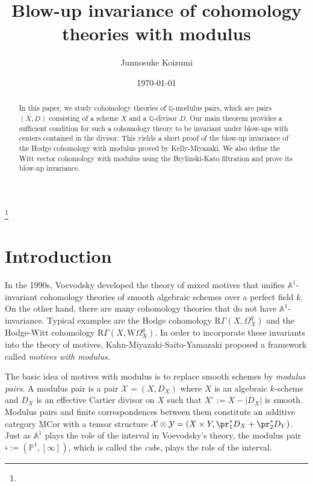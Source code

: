 \documentclass{amsart}
\theoremstyle{plain}
\theoremstyle{definition}
\theoremstyle{remark}
\numberwithin{equation}{section}
\def\bcube{{\overline{\square}}}
\def\RGamma{\mathrm{R}\Gamma}
\def\WOmega{\mathrm{W}\Omega}
\def\MCor{\mathrm{\underline{M}Cor}}
\begin{document}
\title{Blow-up invariance of cohomology theories with modulus}

\author[J. Koizumi]{Junnosuke Koizumi}
\address{Graduate School of Mathematical Sciences, University of Tokyo, 3-8-1 Komaba, Meguro-ku, Tokyo 153-8914, Japan}


\date{\today}
\thanks{}


\begin{abstract}
    In this paper, we study cohomology theories of $\mathbb{Q}$-modulus pairs, which are pairs $(X, D)$ consisting of a scheme $X$ and a $\mathbb{Q}$-divisor $D$.
    Our main theorem provides a sufficient condition for such a cohomology theory to be invariant under blow-ups with centers contained in the divisor.
    This yields a short proof of the blow-up invariance of the Hodge cohomology with modulus proved by Kelly-Miyazaki.
    We also define the Witt vector cohomology with modulus using the Brylinski-Kato filtration and prove its blow-up invariance.
\end{abstract}


\maketitle
\setcounter{tocdepth}{1}
\tableofcontents

\enlargethispage*{20pt}


\section{Introduction}

In the 1990s, Voevodsky developed the theory of mixed motives that unifies $\mathbb{A}^1$-invariant cohomology theories of smooth algebraic schemes over a perfect field $k$.
On the other hand, there are many cohomology theories that do not have $\mathbb{A}^1$-invariance.
Typical examples are the Hodge cohomology $\RGamma(X,\Omega^q_X)$ and the Hodge-Witt cohomology $\RGamma(X,\WOmega^q_X)$.
In order to incorporate these invariants into the theory of motives, Kahn-Miyazaki-Saito-Yamazaki \cite{KMSY1,KMSY2,KMSY3} proposed a framework called \emph{motives with modulus}.

The basic idea of motives with modulus is to replace smooth schemes by \emph{modulus pairs}.
A modulus pair is a pair $\mathcal{X}=(X,D_X)$ where $X$ is an algebraic $k$-scheme and $D_X$ is an effective Cartier divisor on $X$ such that $X^\circ:=X-|D_X|$ is smooth.
Modulus pairs and finite correspondences between them constitute an additive category $\MCor$ with a tensor structure $\mathcal{X}\otimes\mathcal{Y}=(X\times Y, \pr_1^*D_X+\pr_2^*D_Y)$.
Just as $\mathbb{A}^1$ plays the role of the interval in Voevodsky's theory, the modulus pair $\bcube:=(\mathbb{P}^1,[\infty])$, which is called the \emph{cube}, plays the role of the interval.
\end{document}
